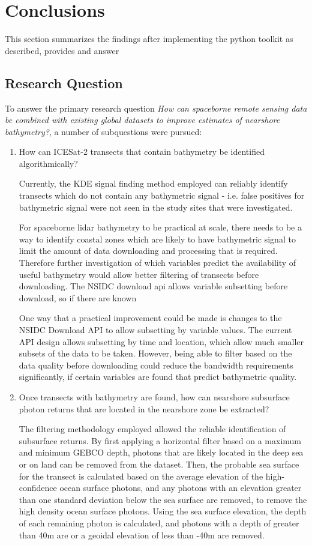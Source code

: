 \chapter{Conclusions}
This section summarizes the findings after implementing the python toolkit as described, provides and answer
\section{Research Question}
To answer the primary research question \emph{How can spaceborne remote sensing data be combined with existing global datasets to improve estimates of nearshore bathymetry?}, a number of subquestions were pursued:

\begin{enumerate}
    \item How can ICESat-2 transects that contain bathymetry be identified algorithmically?

    
    Currently, the KDE signal finding method employed can reliably identify transects which do not contain any bathymetric signal - i.e. false positives for bathymetric signal were not seen in the study sites that were investigated. 
    
    For spaceborne lidar bathymetry to be practical at scale, there needs to be a way to identify coastal zones which are likely to have bathymetric signal to limit the amount of data downloading and processing that is required. Therefore further investigation of which variables predict the availability of useful bathymetry would allow better filtering of transects before downloading. The NSIDC download api allows variable subsetting before download, so if there are known 

    One way that a practical improvement could be made is changes to the NSIDC Download API to allow subsetting by variable values. The current API design allows subsetting by time and location, which allow much smaller subsets of the data to be taken. However, being able to filter based on the data quality before downloading could reduce the bandwidth requirements significantly, if certain variables are found that predict bathymetric quality. 
    
    \item Once transects with bathymetry are found, how can nearshore subsurface photon returns that are located in the nearshore zone be extracted?
    

    The filtering methodology employed allowed the reliable identification of subsurface returns. By first applying a horizontal filter based on a maximum and minimum GEBCO depth, photons that are likely located in the deep sea or on land can be removed from the dataset. Then, the probable sea surface for the transect is calculated based on the average elevation of the high-confidence ocean surface photons, and any photons with an elevation greater than one standard deviation below the sea surface are removed, to remove the high density ocean surface photons. Using the sea surface elevation, the depth of each remaining photon is calculated, and photons with a depth of greater than 40m are or a geoidal elevation of less than -40m are removed. 
    

\end{enumerate}
